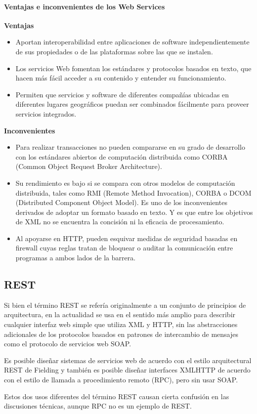 \paragraph{Ventajas e inconvenientes de los Web Services}

\textbf{Ventajas}
\begin{itemize}
\item Aportan interoperabilidad entre aplicaciones de software independientemente de sus propiedades o de las plataformas sobre las que se instalen.
\item Los servicios Web fomentan los estándares y protocolos basados en texto, que hacen más fácil acceder a su contenido y entender su funcionamiento.
\item Permiten que servicios y software de diferentes compañías ubicadas en diferentes lugares geográficos puedan ser combinados fácilmente para proveer servicios integrados.
\end{itemize}


\textbf{Inconvenientes}
\begin{itemize}
\item Para realizar transacciones no pueden compararse en su grado de desarrollo con los estándares abiertos de computación distribuida como CORBA (Common Object Request Broker Architecture).
\item Su rendimiento es bajo si se compara con otros modelos de computación distribuida, tales como RMI (Remote Method Invocation), CORBA o DCOM (Distributed Component Object Model). Es uno de los inconvenientes derivados de adoptar un formato basado en texto. Y es que entre los objetivos de XML no se encuentra la concisión ni la eficacia de procesamiento.
\item Al apoyarse en HTTP, pueden esquivar medidas de seguridad basadas en firewall cuyas reglas tratan de bloquear o auditar la comunicación entre programas a ambos lados de la barrera.
\end{itemize}

\subsection{REST}
\begin{defn}[REST]
Si bien el término REST se refería originalmente a un conjunto de principios de arquitectura, en la actualidad se usa en el sentido más amplio para describir cualquier interfaz web simple que utiliza XML y HTTP, sin las abstracciones adicionales de los protocolos basados en patrones de intercambio de mensajes como el protocolo de servicios web SOAP.

Es posible diseñar sistemas de servicios web de acuerdo con el estilo arquitectural REST de Fielding y también es posible diseñar interfaces XMLHTTP de acuerdo con el estilo de llamada a procedimiento remoto (RPC), pero sin usar SOAP.

Estos dos usos diferentes del término REST causan cierta confusión en las discusiones técnicas, aunque RPC no es un ejemplo de REST.
\end{defn}


